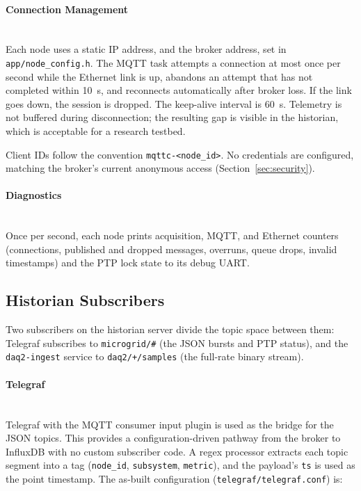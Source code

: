 \paragraph{Connection Management} ~\\
Each node uses a static IP address, and the broker address, set in \texttt{app/node\_config.h}. The MQTT task attempts a connection at most once per second while the Ethernet link is up, abandons an attempt that has not completed within 10~s, and reconnects automatically after broker loss. If the link goes down, the session is dropped. The keep-alive interval is 60~s. Telemetry is not buffered during disconnection; the resulting gap is visible in the historian, which is acceptable for a research testbed.

Client IDs follow the convention \texttt{mqttc-<node\_id>}. No credentials are configured, matching the broker's current anonymous access (Section~\ref{sec:security}).

\paragraph{Diagnostics} ~\\
Once per second, each node prints acquisition, MQTT, and Ethernet counters (connections, published and dropped messages, overruns, queue drops, invalid timestamps) and the PTP lock state to its debug UART.

\subsection{Historian Subscribers}
Two subscribers on the historian server divide the topic space between them: Telegraf subscribes to \texttt{microgrid/\#} (the JSON bursts and PTP status), and the \texttt{daq2-ingest} service to \texttt{daq2/+/samples} (the full-rate binary stream).

\paragraph{Telegraf} ~\\
Telegraf with the MQTT consumer input plugin is used as the bridge for the JSON topics. This provides a configuration-driven pathway from the broker to InfluxDB with no custom subscriber code. A regex processor extracts each topic segment into a tag (\texttt{node\_id}, \texttt{subsystem}, \texttt{metric}), and the payload's \texttt{ts} is used as the point timestamp. The as-built configuration (\texttt{telegraf/telegraf.conf}) is:

